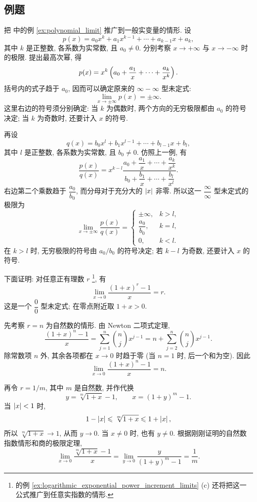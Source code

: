 \subsection{例题}\label{subsec:56}
\label{ex:function_polynomial_limit_at_infinity}
把  中的例 \ref{ex:polynomial_limit} 推广到一般实变量的情形.
设
$$
p(x)=a_0x^k+a_1x^{k-1}+\cdots+a_{k-1}x+a_k,
$$
其中 $k$ 是正整数, 各系数为实常数, 且 $a_0\neq0$.
分别考察 $x\to+\infty$ 与 $x\to-\infty$ 时的极限.
提出最高次幂, 得
$$
p(x)=x^k\left( a_0+\frac{a_1}{x}+\cdots+\frac{a_k}{x^k} \right).
$$
括号内的式子趋于 $a_0$, 因而可以确定原来的 $\infty-\infty$ 型未定式:
$$
\lim_{x\to\pm\infty}p(x)=\pm\infty.
$$
这里右边的符号须分别确定: 当 $k$ 为偶数时, 两个方向的无穷极限都由 $a_0$ 的符号决定;
当 $k$ 为奇数时, 还要计入 $x$ 的符号.

\label{ex:function_rational_polynomial_limit_at_infinity}
再设
$$
q(x)=b_0x^l+b_1x^{l-1}+\cdots+b_{l-1}x+b_l,
$$
其中 $l$ 是正整数, 各系数为实常数, 且 $b_0\neq0$. 仿照上一例, 有
$$
\frac{p(x)}{q(x)}
=x^{k-l}\frac{a_0+\dfrac{a_1}{x}+\cdots+\dfrac{a_k}{x^k}}
{b_0+\dfrac{b_1}{x}+\cdots+\dfrac{b_l}{x^l}}.
$$
右边第二个乘数趋于 $\dfrac{a_0}{b_0}$, 而分母对于充分大的 $\left| x \right|$ 非零.
所以这一 $\dfrac\infty\infty$ 型未定式的极限为
$$
\lim_{x\to\pm\infty}\frac{p(x)}{q(x)}
=\begin{cases}
\pm\infty, & k>l,\\[2pt]
\dfrac{a_0}{b_0}, & k=l,\\[4pt]
0, & k<l.
\end{cases}
$$
在 $k>l$ 时, 无穷极限的符号由 $a_0/b_0$ 的符号决定;
若 $k-l$ 为奇数, 还要计入 $x$ 的符号.

\label{ex:rational_power_increment_limit}\label{Newton_equation}
下面证明: 对任意正有理数 $r$
\footnote{ 的例 \ref{ex:logarithmic_exponential_power_increment_limits} (c) 还将把这一公式推广到任意实指数的情形.}, 有
$$
\lim_{x\to0}\frac{(1+x)^r-1}{x}=r.
$$
这是一个 $\dfrac00$ 型未定式; 在零点附近取 $1+x>0$.

先考察 $r=n$ 为自然数的情形. 由 Newton 二项式定理,
$$
\frac{(1+x)^n-1}{x}
=\sum_{j=1}^{n}\binom nj x^{j-1}
=n+\sum_{j=2}^{n}\binom nj x^{j-1}.
$$
除常数项 $n$ 外, 其余各项都在 $x\to0$ 时趋于零 (当 $n=1$ 时, 后一个和为空).
因此
$$
\lim_{x\to0}\frac{(1+x)^n-1}{x}=n.
$$

再令 $r=1/m$, 其中 $m$ 是自然数, 并作代换
$$
y=\sqrt[m]{1+x}-1,\qquad x=(1+y)^m-1.
$$
当 $\left| x \right|<1$ 时,
$$
1-\left| x \right|\leqslant\sqrt[m]{1+x}\leqslant1+\left| x \right|,
$$
所以 $\sqrt[m]{1+x}\to1$, 从而 $y\to0$.
当 $x\neq0$ 时, 也有 $y\neq0$.
根据刚刚证明的自然数指数情形和商的极限定理,
$$
\lim_{x\to0}\frac{\sqrt[m]{1+x}-1}{x}
=\lim_{y\to0}\frac{y}{(1+y)^m-1}
=\frac1m.
$$

